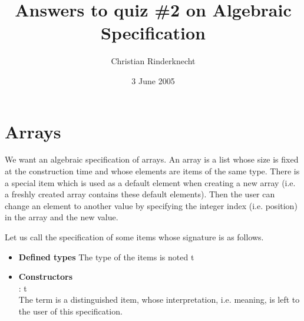 \documentclass[11pt,a4paper]{article}
\title{Answers to quiz \#2 on Algebraic Specification}
\author{Christian Rinderknecht}
\date{3 June 2005}
\newcommand\type[1]{\textsf{#1}}
\begin{document}
\maketitle

\section{Arrays}

We want an algebraic specification of arrays. An array is a list whose
size is fixed at the construction time and whose elements are items of
the same type. There is a special item which is used as a default
element when creating a new array (i.e. a freshly created array
contains these default elements). Then the user can change an element
to another value by specifying the integer index (i.e. position) in
the array and the new value.

\noindent Let us call  the specification of some items whose
signature is as follows.
\begin{itemize}

   \item \textbf{Defined types}
   The type of the items is noted \type{t}

   \item \textbf{Constructors}\\
    : \type{t}\\
   The term  is a distinguished item, whose
   interpretation, i.e. meaning, is left to the user of this
   specification.

\end{itemize}
\end{document}
